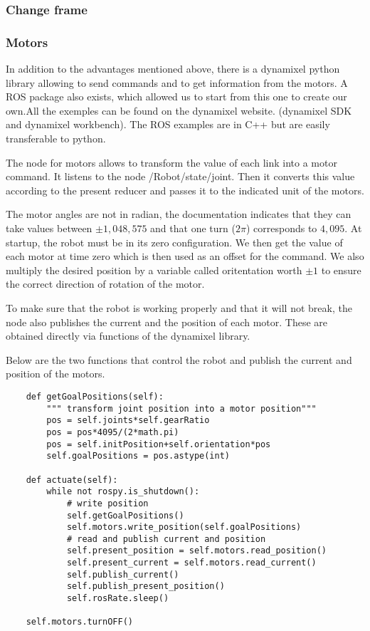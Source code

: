 \subsubsection{Change frame}


\subsubsection{Motors}

In addition to the advantages mentioned above, there is a dynamixel python library allowing to send commands and to get information from the motors. A ROS package also exists, which allowed us to start from this one to create our own.All the exemples can be found on the dynamixel website. (dynamixel SDK and dynamixel workbench). The ROS examples are in C++ but are easily transferable to python.

\bigbreak
The node for motors allows to transform the value of each link into a motor command. It listens to the node /Robot/state/joint. Then it converts this value according to the present reducer and passes it to the indicated unit of the motors.

\bigbreak
The motor angles are not in radian, the documentation indicates that they can take values between $\pm1,048,575$ and that one turn ($2\pi$) corresponds to $4,095$. At startup, the robot must be in its zero configuration. We then get the value of each motor at time zero which is then used as an offset for the command. We also multiply the desired position by a variable called oritentation worth $\pm1$ to ensure the correct direction of rotation of the motor.

\bigbreak
To make sure that the robot is working properly and that it will not break, the node also publishes the current and the position of each motor. These are obtained directly via functions of the dynamixel library.

\bigbreak
Below are the two functions that control the robot and publish the current and position of the motors.
\begin{verbatim}
    def getGoalPositions(self):
        """ transform joint position into a motor position"""
        pos = self.joints*self.gearRatio
        pos = pos*4095/(2*math.pi)
        pos = self.initPosition+self.orientation*pos
        self.goalPositions = pos.astype(int)
        
    def actuate(self):
        while not rospy.is_shutdown():
            # write position
            self.getGoalPositions()
            self.motors.write_position(self.goalPositions)
            # read and publish current and position
            self.present_position = self.motors.read_position()
            self.present_current = self.motors.read_current()
            self.publish_current()
            self.publish_present_position()
            self.rosRate.sleep()

    self.motors.turnOFF()
\end{verbatim}


